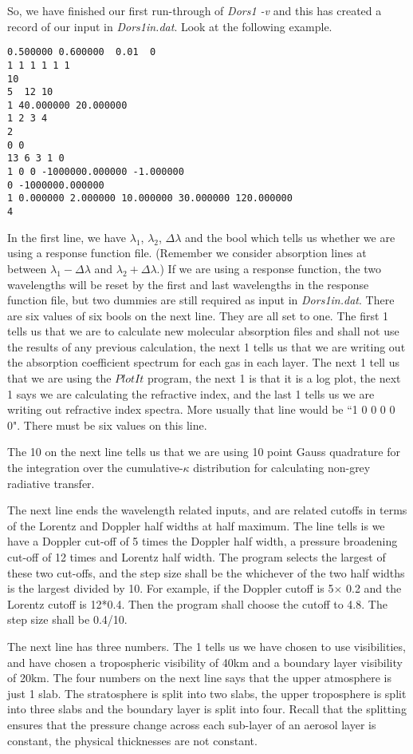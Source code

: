 \documentclass[12pt]{article}
\begin{document}
So, we have finished our first run-through of {\it Dors1 -v} and this has created a record of our input in
 {\it Dors1in.dat}. Look at the following example.
\begin{verbatim}
0.500000 0.600000  0.01  0 
1 1 1 1 1 1
10
5  12 10
1 40.000000 20.000000
1 2 3 4
2
0 0
13 6 3 1 0
1 0 0 -1000000.000000 -1.000000
0 -1000000.000000
1 0.000000 2.000000 10.000000 30.000000 120.000000
4
\end{verbatim}
In the first line, we have $\lambda_1$, $\lambda_2$, $\Delta \lambda$ and the bool which tells us whether
we are using a response function file. (Remember we consider absorption lines at between $\lambda_1-\Delta \lambda$
 and $ \lambda_2+\Delta \lambda$.) If we are using a response function, the two wavelengths
will be reset by the first and last wavelengths in the response function file, but two dummies are still required as input in
{\it Dors1in.dat}. There are six values of six bools on the next line. They are all set to one. The first 1 tells us that we are to calculate new molecular absorption files and shall not use the results of any previous calculation, the next 1 tells us that we are writing out
 the absorption coefficient spectrum for each gas in each layer. The next 1 tell us that we are using
the $PlotIt$ program, the next 1 is that it is a  log plot, the next 1 says we are calculating the refractive index, 
 and the last 1 tells us we are writing out
refractive index spectra. More usually that line would be ``1 0 0 0 0 0". There must be six values on this line.
 
The 10 on the next line tells us that we are using
10 point Gauss quadrature for the integration over the cumulative-$\kappa$ distribution for calculating non-grey 
radiative transfer. 

The next line ends the wavelength related inputs, and are related cutoffs in terms of the
Lorentz and Doppler half widths at half maximum. 
The line tells is we have a Doppler cut-off of 5 times the Doppler half width, a pressure broadening 
cut-off of 12 times and Lorentz half width. The program selects the largest of these two cut-offs,
 and the step size shall be the whichever of the two half widths is the largest divided by 10.
For example, if the Doppler cutoff is 5$\times$ 0.2 and the Lorentz cutoff is 12*0.4. Then the program
 shall choose the  cutoff to  4.8. The step size shall be 0.4/10.

 The next line has three numbers. The 1 tells us we have chosen to
 use visibilities,  and have chosen a tropospheric visibility of 40km and a boundary layer visibility
of 20km. The four numbers on the next line says that the 
upper atmosphere is just 1 slab. The stratosphere is split into two slabs, the upper
troposphere is split into three slabs and the boundary layer is split into four. Recall 
that the splitting ensures that the pressure change across each sub-layer of an
aerosol layer is constant, the physical thicknesses are not constant.
\end{document}
